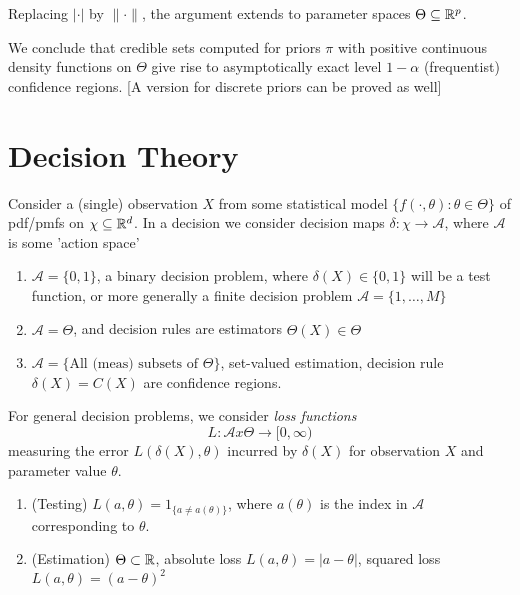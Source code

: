 \documentclass[a4paper]{article}
\begin{document}
Replacing $|\cdot |$ by $\|\cdot \|$, the argument extends to parameter spaces $\Theta \subseteq \mathbb{R}^{p}$.

We conclude that credible sets computed for priors $\pi$ with positive continuous density functions on $\Theta$ give rise to asymptotically exact level $1- \alpha$ (frequentist) confidence regions. [A version for discrete priors can be proved as well]

\section{Decision Theory}

Consider a (single) observation $X$ from some statistical model $\{f\left( \cdot , \theta \right) : \theta \in \Theta \}$ of pdf/pmfs on $\chi \subseteq \mathbb{R}^{d}$. In a decision we consider decision maps $\delta : \chi \to \mathcal{A}$, where $\mathcal{A}$ is some 'action space'

\begin{eg}
	\begin{enumerate}[label=\roman*)]
		\item $\mathcal{A} = \{0,1\} $, a binary decision problem, where $\delta(X) \in \{0,1\} $ will be a test function, or more generally a finite decision problem $\mathcal{A} = \{1,\ldots,M\} $
		\item $\mathcal{A} = \Theta$, and decision rules are estimators $\hat{\Theta}(X) \in  \Theta$
		\item $\mathcal{A} = \{ \text{All (meas) subsets of } \Theta\} $, set-valued estimation, decision rule $\delta(X) = C(X)$ are confidence regions.
	\end{enumerate}
\end{eg}

For general decision problems, we consider \textit{loss functions}
\[
	L: \mathcal{A} x \Theta \to [0, \infty)
\] 
measuring the error $L(\delta(X), \theta)$ incurred by  $\delta(X)$ for observation $X$ and parameter value $\theta$.

\begin{eg}
	\begin{enumerate}[label=\roman*)]
		\item (Testing) $L(a,\theta) = 1_{\{a \neq  a(\theta)\} }$, where $a(\theta)$ is the index in $\mathcal{A}$ corresponding to $\theta$.
		\item (Estimation) $\Theta \subset \mathbb{R}$, absolute loss $L(a,\theta) = |a-\theta|$, squared loss $L(a,\theta) = (a-\theta)^2$
	\end{enumerate}
\end{eg}
\end{document}
